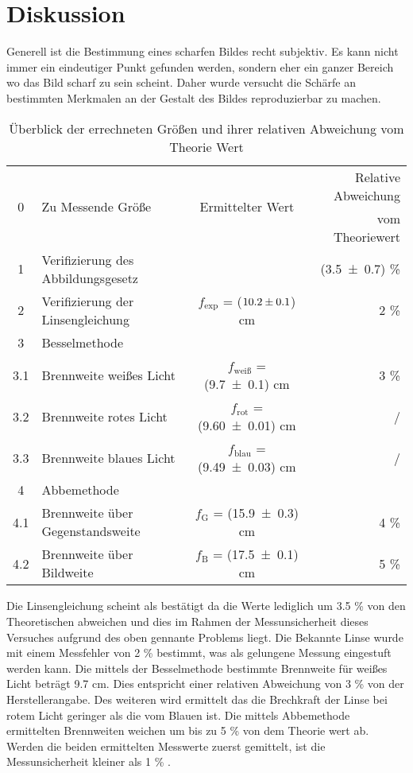 \section{Diskussion}
\label{sec:Diskussion}
Generell ist die Bestimmung eines scharfen Bildes recht subjektiv. Es kann nicht immer ein eindeutiger Punkt gefunden werden, sondern eher ein ganzer Bereich wo das Bild scharf zu sein scheint. Daher wurde versucht die Schärfe an bestimmten Merkmalen an der Gestalt des Bildes reproduzierbar zu machen.
\begin{table}
  \centering
  \begin{tabular}{c| l | c |r}
    \toprule
    \multirow{2}{*}{0} & \multirow{2}{*}{Zu Messende Größe} & \multirow{2}{*}{Ermittelter Wert} & Relative Abweichung \\
 	& & & vom Theoriewert \\
    \midrule
    	1 & Verifizierung des Abbildungsgesetz & & (\num{3.5 +- 0.7}) \% \\
	2 & Verifizierung der Linsengleichung & $f_\text{exp}$ = ($\num{10.2 +- 0.1}$) cm & 2 \% \\
	3 & Besselmethode & & \\
	3.1 &Brennweite weißes Licht & $f_\text{weiß}$ = (\num{9.7 +- 0.1}) cm & 3 \% \\
	3.2 &Brennweite rotes Licht  & $f_\text{rot}$  = (\num{9.60 +- 0.01}) cm & / \\
	3.3 &Brennweite blaues Licht & $f_\text{blau}$ = (\num{9.49 +- 0.03}) cm & / \\
	4 & Abbemethode & & \\
	4.1 & Brennweite über Gegenstandsweite& $f_\text{G}$ = (\num{15.9 +- 0.3}) cm &  4 \% \\
	4.2 & Brennweite über Bildweite & $f_\text{B}$ = (\num{17.5 +- 0.1}) cm & 5 \% \\
    \bottomrule
  \end{tabular}
  \caption{Überblick der errechneten Größen und ihrer relativen Abweichung vom Theorie Wert}
  \label{tab:über}
\end{table}
Die Linsengleichung scheint als bestätigt da die Werte lediglich um 3.5 \% von den Theoretischen abweichen und dies im Rahmen der Messunsicherheit dieses Versuches aufgrund des oben gennante Problems liegt.
Die Bekannte Linse wurde mit einem Messfehler von 2 \% bestimmt, was als gelungene Messung eingestuft werden kann.
Die mittels der Besselmethode bestimmte Brennweite für weißes Licht beträgt 9.7 cm. Dies entspricht einer relativen Abweichung von 3 \% von der Herstellerangabe. Des weiteren wird ermittelt das die Brechkraft der Linse bei rotem Licht geringer als die vom Blauen ist.
Die mittels Abbemethode ermittelten Brennweiten weichen um bis zu 5 \% von dem Theorie wert ab. Werden die beiden ermittelten Messwerte zuerst gemittelt, ist die Messunsicherheit kleiner als 1 \% .
